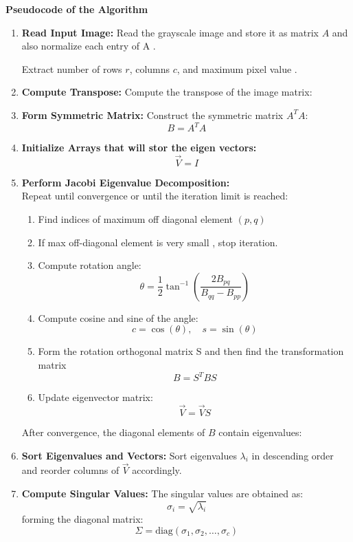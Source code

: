 \documentclass[journal]{IEEEtran}
\begin{document}
\textbf{Pseudocode of the Algorithm}
\begin{enumerate}
    \item \textbf{Read Input Image:}  
    Read the grayscale image and store it as matrix \( A \) and also normalize each entry of A .  
    
    Extract number of rows \( r \), columns \( c \), and maximum pixel value .

    \item \textbf{Compute Transpose:}  
    Compute the transpose of the image matrix:

    \item \textbf{Form Symmetric Matrix:}  
    Construct the symmetric matrix \( A^T A \):
    \[
    B = A^T A
    \]

    \item \textbf{Initialize Arrays that will stor the eigen vectors:}  
    \[
    \vec{V} = I
    \]
   
    \item \textbf{Perform Jacobi Eigenvalue Decomposition:}\\ 
    Repeat until convergence or until the iteration limit is reached:
    \begin{enumerate}
        \item Find indices of maximum off diagonal element \( (p, q) \)
        \item If max off-diagonal element is very small , stop iteration.
        \item Compute rotation angle:
        \[
        \theta = \frac{1}{2} \tan^{-1}\left( \frac{2 B_{pq}}{B_{qq} - B_{pp}} \right)
        \]
        \item Compute cosine and sine of the angle:
        \[
        c = \cos(\theta), \quad s = \sin(\theta)
        \]
        \item Form the rotation orthogonal matrix S and then find the transformation matrix 
        \[
        B = S^T B S
        \]
        \item Update eigenvector matrix:
        \[
        \vec{V} = \vec{V} S
        \]
    \end{enumerate}
    After convergence, the diagonal elements of \( B \) contain eigenvalues:

    \item \textbf{Sort Eigenvalues and Vectors:}  
    Sort eigenvalues \( \lambda_i \) in descending order and reorder columns of \( \vec{V} \) accordingly.

    \item \textbf{Compute Singular Values:}  
    The singular values are obtained as:
    \[
    \sigma_i = \sqrt{\lambda_i}
    \]
    forming the diagonal matrix:
    \[
    \Sigma = \text{diag}(\sigma_1, \sigma_2, \dots, \sigma_c)
    \]


\end{enumerate}
\end{document}
